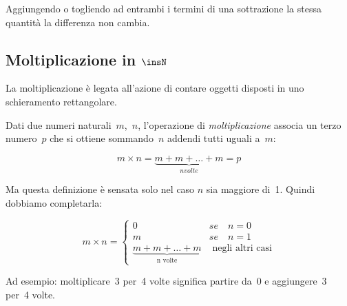 \begin{definizione}
Aggiungendo o togliendo ad entrambi i 
termini di una sottrazione la stessa quantità la differenza non cambia.
\end{definizione}

\subsection{Moltiplicazione in \(\insN\)}

La moltiplicazione è legata all'azione di contare oggetti disposti in uno
schieramento rettangolare.

\begin{definizione}
Dati due numeri naturali~\(m\),~\(n\), l'operazione di \emph{moltiplicazione} 
associa un terzo numero~\(p\) che si ottiene sommando~\(n\) addendi tutti 
uguali a~\(m\):

\begin{inaccessibleblock}[
\[m \times n = \mbox{n volte}{(m + m + \dots + m)} = p\]
]
\[m \times n = \underbrace{m + m + \dots + m}_{n volte} = p\]
\end{inaccessibleblock}
\end{definizione}

Ma questa definizione è sensata solo nel caso \(n\) sia maggiore di~1.
Quindi dobbiamo completarla:

\begin{inaccessibleblock}[
\begin{definizione}
\[
m \times n = \begin{cases}
 0 & se \quad n = 0\\
 m & se \quad n = 1\\
 \mbox{n volte}{(m + m + \dots + m)} & \mbox{ negli altri casi}
\end{cases}\]
\end{definizione}
]
\begin{definizione}
\[
m \times n = \begin{cases}
 0 & se \quad n = 0\\
 m & se \quad n = 1\\
 \underbrace{m + m + \dots + m}_{\text{n volte}} & \mbox{ negli altri casi}
\end{cases}\]
\end{definizione}
\end{inaccessibleblock}

Ad esempio: moltiplicare~3 per~4 volte significa partire da~0 e 
aggiungere~3 per~4 volte.


